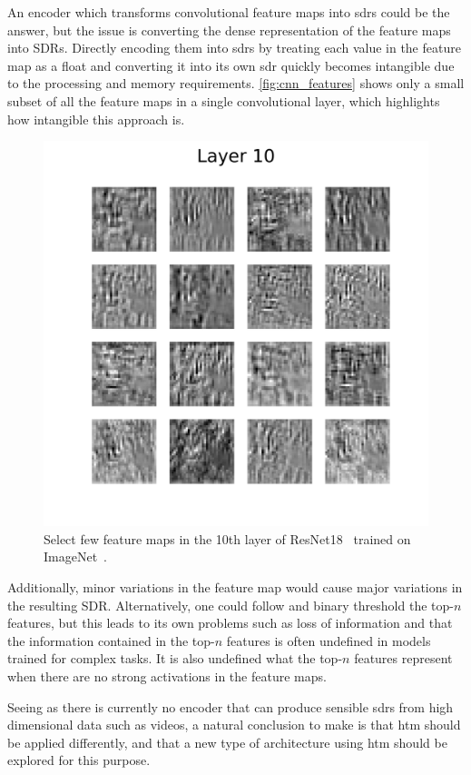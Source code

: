 \par
An encoder which transforms convolutional feature maps into \glspl*{sdr} could be the answer, but the issue is converting the dense representation of the feature maps into SDRs. Directly encoding them into \glspl*{sdr} by treating each value in the feature map as a float and converting it into its own \gls*{sdr} quickly becomes intangible due to the processing and memory requirements. \autoref{fig:cnn_features} shows only a small subset of all the feature maps in a single convolutional layer, which highlights how intangible this approach is.
\begin{figure}[htb]
    \centering
    \includegraphics[width=0.5\linewidth]{resources/related_works/resnet18_layer_10.png}
    \caption[Feature Maps]{Select few feature maps in the 10th layer of ResNet18~\cite{resnet} trained on ImageNet~\cite{imagenet}.}
    \label{fig:cnn_features}
\end{figure}
\par
Additionally, minor variations in the feature map would cause major variations in the resulting SDR. Alternatively, one could follow \textcite{CNN_HTM} and binary threshold the top-$n$ features, but this leads to its own problems such as loss of information and that the information contained in the top-$n$ features is often undefined in models trained for complex tasks. It is also undefined what the top-$n$ features represent when there are no strong activations in the feature maps.
\par
Seeing as there is currently no encoder that can produce sensible \glspl*{sdr} from high dimensional data such as videos, a natural conclusion to make is that \gls*{htm} should be applied differently, and that a new type of architecture using \gls*{htm} should be explored for this purpose.
